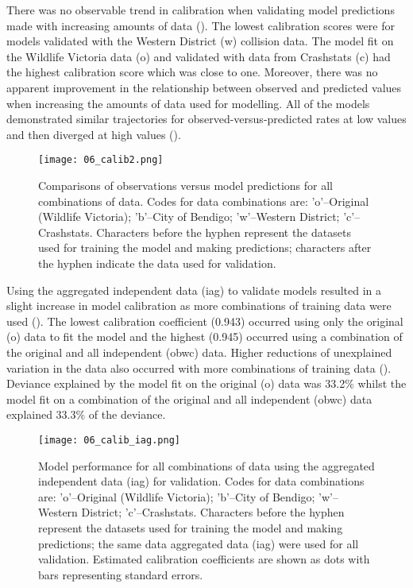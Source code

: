 There was no observable trend in calibration when validating model predictions made with increasing amounts of data (). The lowest calibration scores were for models validated with the Western District (w) collision data. The model fit on the Wildlife Victoria data (o) and validated with data from Crashstats (c) had the highest calibration score which was close to one. Moreover, there was no apparent improvement in the relationship between observed and predicted values when increasing the amounts of data used for modelling. All of the models demonstrated similar trajectories for observed-versus-predicted rates at low values and then diverged at high values ().

\begin{figure*}[htp]
  \centering
  \texttt{[image: 06\_calib2.png]}
  \caption[Comparisons of observations versus model predictions for all combinations of original and independent data]{Comparisons of observations versus model predictions for all combinations of data. Codes for data combinations are: 'o'--Original (Wildlife Victoria); 'b'--City of Bendigo; 'w'--Western District; 'c'--Crashstats. Characters before the hyphen represent the datasets used for training the model and making predictions; characters after the hyphen indicate the data used for validation.}
  \label{val_calib2}
\end{figure*}

Using the aggregated independent data (iag) to validate models resulted in a slight increase in model calibration as more combinations of training data were used ().  The lowest calibration coefficient (0.943) occurred using only the original (o) data to fit the model and the highest (0.945) occurred using a combination of the original and all independent (obwc) data. Higher reductions of unexplained variation in the data also occurred with more combinations of training data (). Deviance explained by the model fit on the original (o) data was 33.2\% whilst the model fit on a combination of the original and all independent (obwc) data explained 33.3\% of the deviance.

\begin{figure*}[htp]
  \centering
  \texttt{[image: 06\_calib\_iag.png]}
  \caption[Model calibration for all combinations of training data using the aggregated independent data for validation]{Model performance for all combinations of data using the aggregated independent data (iag) for validation. Codes for data combinations are: 'o'--Original (Wildlife Victoria); 'b'--City of Bendigo; 'w'--Western District; 'c'--Crashstats. Characters before the hyphen represent the datasets used for training the model and making predictions; the same data aggregated data (iag) were used for all validation. Estimated calibration coefficients are shown as dots with bars representing standard errors.}
  \label{val_calib_iag}
\end{figure*}


